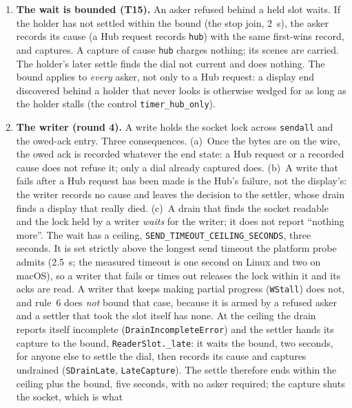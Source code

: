 \documentclass[a4paper,10pt,fleqn]{article}
\begin{document}
\begin{enumerate}
    and fails waiters with the Hub's error immediately, without fixing a cause.
    It does not capture, and it does not redial.
  \item \textbf{The wait is bounded (T15).}  An asker refused behind a held slot
    waits.  If the holder has not settled within the bound (the stop join,
    2~s), the asker records its cause (a Hub request records \texttt{hub}) with
    the same first-wins record, and captures.  A capture of cause \texttt{hub}
    charges nothing; its scenes are carried.  The holder's later settle finds the
    dial not current and does nothing.  The bound applies to \emph{every} asker,
    not only to a Hub request: a display end discovered behind a holder that
    never looks is otherwise wedged for as long as the holder stalls
    (the control \texttt{timer\_hub\_only}).
  \item \textbf{The writer (round 4).}  A write holds the socket lock across
    \texttt{sendall} and the owed-ack entry.  Three consequences.  (a)~Once the
    bytes are on the wire, the owed ack is recorded whatever the end state: a Hub
    request or a recorded cause does not refuse it; only a dial already captured
    does.  (b)~A write that fails after a Hub request has been made is the
    Hub's failure, not the display's: the writer records no cause and leaves the
    decision to the settler, whose drain finds a display that really died.
    (c)~A drain that finds the socket readable and the lock held by a writer
    \emph{waits} for the writer; it does not report ``nothing more''.  The wait
    has a ceiling, \texttt{SEND\_TIMEOUT\_CEILING\_SECONDS}, three seconds.  It is
    set strictly above the longest send timeout the platform probe admits
    (2.5~s; the measured timeout is one second on Linux and two on macOS), so a
    writer that fails or times out releases the lock within it and its acks are
    read.  A writer that keeps making partial progress
    (\texttt{WStall}) does not, and rule~6 does \emph{not} bound that case,
    because it is armed by a refused asker and a settler that took the slot
    itself has none.  At the ceiling the drain reports itself incomplete
    (\texttt{DrainIncompleteError}) and the settler hands its capture to the
    bound, \texttt{ReaderSlot.\_late}: it waits the bound, two seconds, for
    anyone else to settle the dial, then records its cause and captures
    undrained (\texttt{SDrainLate}, \texttt{LateCapture}).  The settle therefore
    ends within the ceiling plus the bound, five seconds, with no asker
    required; the capture shuts the socket, which is what

\end{enumerate}
\end{document}
